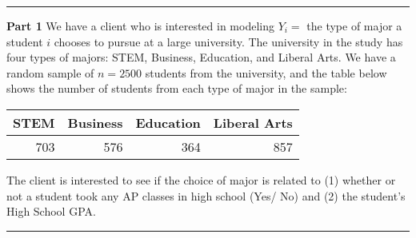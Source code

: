 \documentclass[11pt]{article}
\begin{document}
\begin{titlepage}



\end{titlepage}

\pagebreak

$\:$ \\
\thispagestyle{empty}
\pagebreak

\setcounter{page}{1}

\rule{\textwidth}{0.5pt}


\textbf{Part 1} We have a client who is interested in modeling $Y_i =$ the type of major a student $i$ chooses to pursue at a large university. The university in the study has four types of majors: STEM, Business, Education, and Liberal Arts. We have a random sample of $n = 2500$ students from the university, and the table below shows the number of students from each type of major in the sample:

\begin{table}[!h]
\centering
\begin{tabular}{rrrr}
STEM & Business & Education & Liberal Arts \\ \hline 
703 & 576 & 364 & 857
\end{tabular}
\end{table}

The client is interested to see if the choice of major is related to (1) whether or not a student took any AP classes in high school (Yes/ No) and (2) the student's High School GPA.

\rule{\textwidth}{1pt}
\end{document}

